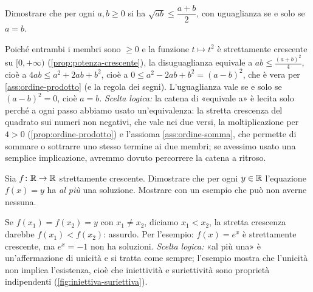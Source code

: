 \begin{esercizio}
Dimostrare che per ogni $a,b\ge0$ si ha $\sqrt{ab}\le\dfrac{a+b}{2}$, con uguaglianza se
e solo se $a=b$.
\begin{soluzione}
Poiché entrambi i membri sono $\ge0$ e la funzione $t\mapsto t^{2}$ è strettamente
crescente su $[0,+\infty)$ (\cref{prop:potenza-crescente}), la disuguaglianza equivale
a $ab\le\frac{(a+b)^{2}}{4}$, cioè a $4ab\le a^{2}+2ab+b^{2}$, cioè a
$0\le a^{2}-2ab+b^{2}=(a-b)^{2}$, che è vera per \ref{ass:ordine-prodotto} (e la regola
dei segni). L'uguaglianza vale se e solo se $(a-b)^{2}=0$, cioè $a=b$. \emph{Scelta
logica:} la catena di «equivale a» è lecita solo perché a ogni passo abbiamo usato
un'equivalenza: la stretta crescenza del quadrato sui numeri non negativi, che vale nei
due versi, la moltiplicazione per $4>0$ (\cref{prop:ordine-prodotto}) e l'assioma
\ref{ass:ordine-somma}, che permette di sommare o sottrarre uno stesso termine ai due
membri; se avessimo usato una semplice implicazione, avremmo dovuto percorrere la
catena a ritroso.
\end{soluzione}
\end{esercizio}

\begin{marginfigure}
\centering
{}
\caption{Media aritmetica e geometrica: in una semicirconferenza di diametro $a+b$,
l'altezza $\sqrt{ab}$ (secondo teorema di Euclide) non supera mai il raggio.}
\end{marginfigure}

\begin{esercizio}
Sia $f\colon\mathbb{R}\to\mathbb{R}$ strettamente crescente. Dimostrare che per ogni $y\in\mathbb{R}$
l'equazione $f(x)=y$ ha \emph{al più} una soluzione. Mostrare con un esempio che può
non averne nessuna.
\begin{soluzione}
Se $f(x_{1})=f(x_{2})=y$ con $x_{1}\neq x_{2}$, diciamo $x_{1}<x_{2}$, la stretta
crescenza darebbe $f(x_{1})<f(x_{2})$: assurdo. Per l'esempio: $f(x)=e^{x}$ è
strettamente crescente, ma $e^{x}=-1$ non ha soluzioni. \emph{Scelta logica:} «al più
una» è un'affermazione di unicità e si tratta come sempre; l'esempio mostra che
l'unicità non implica l'esistenza, cioè che iniettività e suriettività sono proprietà
indipendenti (\cref{fig:iniettiva-suriettiva}).
\end{soluzione}
\end{esercizio}

